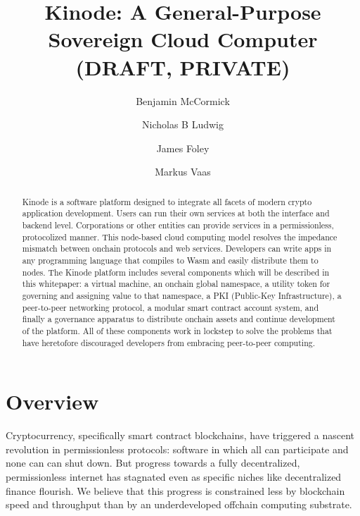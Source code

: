 \documentclass[runningheads]{llncs}
\begin{document}
%
\title{Kinode: A General-Purpose Sovereign Cloud Computer (DRAFT, PRIVATE)}
%
%
\author{
Benjamin McCormick \and
Nicholas B Ludwig \and
James Foley \and
Markus Vaas
}
%
\maketitle %
%
\begin{abstract}
Kinode is a software platform designed to integrate all facets of modern crypto application development.
Users can run their own services at both the interface and backend level.
Corporations or other entities can provide services in a permissionless, protocolized manner.
This node-based cloud computing model resolves the impedance mismatch between onchain protocols and web services.
Developers can write apps in any programming language that compiles to Wasm and easily distribute them to nodes.
The Kinode platform includes several components which will be described in this whitepaper: a virtual machine, an onchain global namespace, a utility token for governing and assigning value to that namespace, a PKI (Public-Key Infrastructure), a peer-to-peer networking protocol, a modular smart contract account system, and finally a governance apparatus to distribute onchain assets and continue development of the platform.
All of these components work in lockstep to solve the problems that have heretofore discouraged developers from embracing peer-to-peer computing.

\end{abstract}
%
\tableofcontents
%
%
%
%
\section{Overview}
\label{sec:overview}

Cryptocurrency, specifically smart contract blockchains, have triggered a nascent revolution in permissionless protocols: software in which all can participate and none can can shut down.
But progress towards a fully decentralized, permissionless internet has stagnated even as specific niches like decentralized finance flourish.
We believe that this progress is constrained less by blockchain speed and throughput than by an underdeveloped offchain computing substrate.
\end{document}
